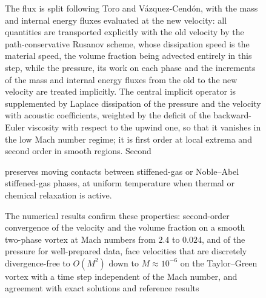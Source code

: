 \begin{figure}[p]
{%
The flux is split following Toro and V\'azquez-Cend\'on, with the mass and internal energy fluxes evaluated at the new
velocity: all quantities are transported explicitly with the old velocity by the path-conservative Rusanov scheme, whose
dissipation speed is the material speed, the volume fraction being advected entirely in this step, while the pressure,
its work on each phase and the increments of the mass and internal energy fluxes from the old to the new velocity are
treated implicitly. The central implicit operator is supplemented by Laplace dissipation of the
pressure and the velocity with acoustic coefficients, weighted by the deficit of the backward-Euler viscosity with respect to
the upwind one, so that it vanishes in the low Mach number regime; it is first order at local extrema and second order in
smooth regions. Second

preserves moving contacts between stiffened-gas or Noble--Abel stiffened-gas phases, at uniform temperature when thermal or
chemical relaxation is active.

The numerical results confirm these properties: second-order convergence of the velocity and the volume fraction on a
smooth two-phase vortex at Mach numbers from $2.4$ to $0.024$, and of the pressure for well-prepared data, face velocities
that are discretely divergence-free to $O(M^2)$ down to $M\approx10^{-6}$ on the Taylor--Green vortex with a time step
independent of the Mach number, and agreement with exact solutions and reference results

}
\end{figure}
